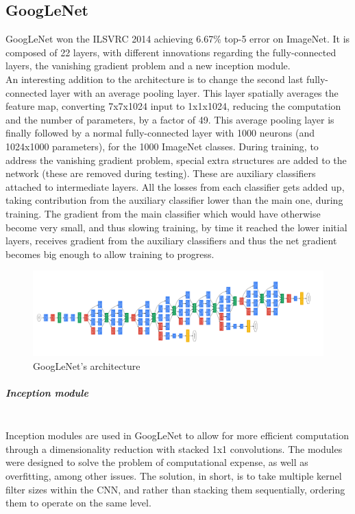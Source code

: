 \documentclass{article}
\begin{document}
\subsection{GoogLeNet}
GoogLeNet won the ILSVRC 2014 achieving 6.67\% top-5 error on ImageNet. It is composed of 22 layers, with different innovations regarding the fully-connected layers, the vanishing gradient problem and a new inception module.\\
An interesting addition to the architecture is to change the second last fully-connected layer with an average pooling layer. This layer spatially averages the feature map, converting 7x7x1024 input to 1x1x1024, reducing the computation and the number of parameters, by a factor of 49. This average pooling layer is finally followed by a normal fully-connected layer with 1000 neurons (and 1024x1000 parameters), for the 1000 ImageNet classes.
During training, to address the vanishing gradient problem, special extra structures are added to the network (these are removed during testing). These are auxiliary classifiers attached to intermediate layers. All the losses from each classifier gets added up, taking contribution from the auxiliary classifier lower
than the main one, during training. The gradient from the main classifier which would have otherwise become very small, and thus slowing training, by time it reached the lower initial layers, receives gradient from the auxiliary classifiers and thus the net gradient becomes big enough to allow training to progress.
\begin{figure}[h]
	\centering
	\includegraphics[width=0.7\linewidth]{image/GoogLeNet}
	\caption[]{GoogLeNet's architecture}
	\label{fig:googlenet}
\end{figure}

\subparagraph{Inception module}\mbox{}\\
Inception modules are used in GoogLeNet to allow for more efficient computation through a dimensionality reduction with stacked 1x1 convolutions. The modules were designed to solve the problem of computational expense, as well as overfitting, among other issues. The solution, in short, is to take multiple kernel filter sizes within the CNN, and rather than stacking them sequentially, ordering them to operate on the same level. 
\end{document}
